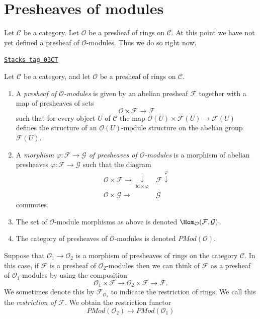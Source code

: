 \section{Presheaves of modules}
\label{sites-modules-section-presheaves-modules}
Let $\mathcal{C}$ be a category.
Let $\mathcal{O}$ be a presheaf of rings on $\mathcal{C}$.
At this point we have not yet defined a presheaf of $\mathcal{O}$-modules.
Thus we do so right now.

\begin{definition}
\label{sites-modules-definition-presheaf-modules}
\href{https://stacks.math.columbia.edu/tag/03CT}{\texttt{Stacks tag 03CT}}

Let $\mathcal{C}$ be a category, and
let $\mathcal{O}$ be a presheaf of rings on $\mathcal{C}$.
\begin{enumerate}
\item A {\it presheaf of $\mathcal{O}$-modules}
is given by an abelian presheaf $\mathcal{F}$ together with a
map of presheaves of sets
$$
\mathcal{O} \times \mathcal{F} \longrightarrow \mathcal{F}
$$
such that for every object $U$ of $\mathcal{C}$ the map
$\mathcal{O}(U) \times \mathcal{F}(U) \to \mathcal{F}(U)$
defines the structure of an $\mathcal{O}(U)$-module
structure on the abelian group $\mathcal{F}(U)$.
\item A {\it morphism $\varphi : \mathcal{F} \to \mathcal{G}$
of presheaves of $\mathcal{O}$-modules} is a morphism of abelian presheaves
$\varphi : \mathcal{F} \to \mathcal{G}$ such that
the diagram
$$
\begin{array}{cc}\mathcal{O} \times \mathcal{F} \longrightarrow\underset{\text{id} \times \varphi}{\downarrow} & \mathcal{F} \overset{\varphi}{\downarrow} \\ \mathcal{O} \times \mathcal{G} \longrightarrow & \mathcal{G}\end{array}
$$
commutes.
\item The set of $\mathcal{O}$-module morphisms as above is
denoted $\Hom_\mathcal{O}(\mathcal{F}, \mathcal{G})$.
\item The category of presheaves of $\mathcal{O}$-modules is denoted
$\textit{PMod}(\mathcal{O})$.
\end{enumerate}
\end{definition}

Suppose that $\mathcal{O}_1 \to \mathcal{O}_2$ is a
morphism of presheaves of rings on the category $\mathcal{C}$. In this case,
if $\mathcal{F}$ is a presheaf of $\mathcal{O}_2$-modules
then we can think of $\mathcal{F}$ as a presheaf of
$\mathcal{O}_1$-modules by using the composition
$$
\mathcal{O}_1 \times \mathcal{F}
\to
\mathcal{O}_2 \times \mathcal{F}
\to
\mathcal{F}.
$$
We sometimes denote this by $\mathcal{F}_{\mathcal{O}_1}$
to indicate the restriction of rings. We call this
the {\it restriction of $\mathcal{F}$}. We obtain the
restriction functor
$$
\textit{PMod}(\mathcal{O}_2)
\longrightarrow
\textit{PMod}(\mathcal{O}_1)
$$

